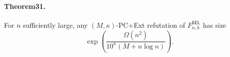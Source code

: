 \paragraph{Theorem31.} For $n$ sufficiently large, any $(M,\kappa)$-PC+Ext refutation of $F^{\mathsf{SEL}}_{n,k}$ has size
\[\exp\left(\frac{\Omega(n^2)}{10^{\kappa}(M+n\log n)}\right).\]
